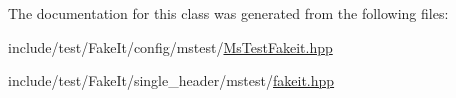 The documentation for this class was generated from the following files\+:\begin{DoxyCompactItemize}
\item 
include/test/\+Fake\+It/config/mstest/\mbox{\hyperlink{MsTestFakeit_8hpp}{Ms\+Test\+Fakeit.\+hpp}}\item 
include/test/\+Fake\+It/single\+\_\+header/mstest/\mbox{\hyperlink{single__header_2mstest_2fakeit_8hpp}{fakeit.\+hpp}}\end{DoxyCompactItemize}
